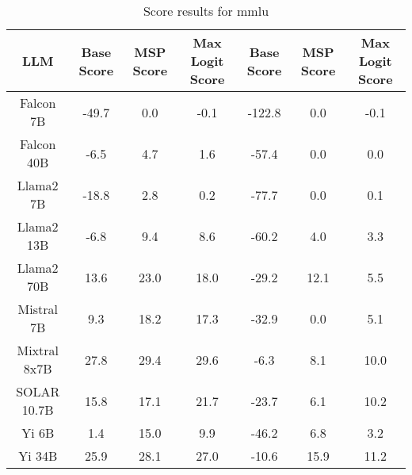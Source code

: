 \renewcommand\arraystretch{1.2}
\begin{table*}
\centering
\begin{tabular}{c|c|c|c|c|c|c}
LLM & Base Score & MSP Score & Max Logit Score & Base Score & MSP Score & Max Logit Score\\ \hline
Falcon 7B & -49.7 & 0.0 & -0.1 & -122.8 & 0.0 & -0.1\\
Falcon 40B & -6.5 & 4.7 & 1.6 & -57.4 & 0.0 & 0.0\\
Llama2 7B & -18.8 & 2.8 & 0.2 & -77.7 & 0.0 & 0.1\\
Llama2 13B & -6.8 & 9.4 & 8.6 & -60.2 & 4.0 & 3.3\\
Llama2 70B & 13.6 & 23.0 & 18.0 & -29.2 & 12.1 & 5.5\\
Mistral 7B & 9.3 & 18.2 & 17.3 & -32.9 & 0.0 & 5.1\\
Mixtral 8x7B & 27.8 & 29.4 & 29.6 & -6.3 & 8.1 & 10.0\\
SOLAR 10.7B & 15.8 & 17.1 & 21.7 & -23.7 & 6.1 & 10.2\\
Yi 6B & 1.4 & 15.0 & 9.9 & -46.2 & 6.8 & 3.2\\
Yi 34B & 25.9 & 28.1 & 27.0 & -10.6 & 15.9 & 11.2\\
\hline
\end{tabular}
\caption{Score results for mmlu}
\end{table*}
\label{tab:mmlu_score}
